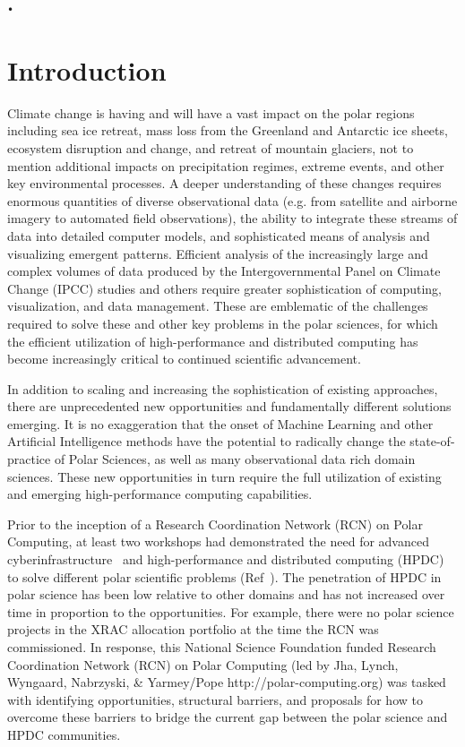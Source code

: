 \texttt{•}\documentclass[10pt,letterpaper,draft]{article}
\begin{document}
\vspace{0.15in}

\section{Introduction}

Climate change is having and will have a vast impact on the polar regions including sea ice retreat, mass loss from the Greenland and Antarctic ice sheets, ecosystem disruption and change, and retreat of mountain glaciers, not to mention additional impacts on precipitation regimes, extreme events, and other key environmental processes. A deeper understanding of these changes requires enormous quantities of diverse observational data (e.g. from satellite and airborne imagery to automated field observations), the ability to integrate these streams of data into detailed computer models, and sophisticated means of analysis and visualizing emergent patterns.  Efficient analysis of the increasingly large and complex volumes of data produced by the Intergovernmental Panel on Climate Change (IPCC) studies and others require greater sophistication of computing, visualization, and data management. These are emblematic of the challenges required to solve these and other key problems in the polar sciences, for which the efficient utilization of high-performance and distributed computing has become increasingly critical to continued scientific advancement.

In addition to scaling and increasing the sophistication of existing approaches, there are unprecedented new opportunities and fundamentally different solutions emerging. It is no exaggeration that the onset of Machine Learning and other Artificial Intelligence methods have the potential to radically change the state-of-practice of Polar Sciences, as well as many observational data rich domain sciences.  These new opportunities in turn require the full utilization of existing and emerging high-performance computing capabilities. 

Prior to the inception of a Research Coordination Network (RCN) on Polar Computing, at least two workshops had demonstrated the need for advanced cyberinfrastructure~\cite{Skytland2016-jk} and high-performance and distributed computing (HPDC) to solve different polar scientific problems (Ref~\cite{hackathon_guide,Leckart2015-go}). The penetration of HPDC in polar science has been low relative to other domains and has not increased over time in proportion to the opportunities. For example, there were no polar science projects in the XRAC allocation portfolio at the time the RCN was commissioned. In response, this National Science Foundation funded Research Coordination Network (RCN) on Polar Computing (led by Jha, Lynch, Wyngaard, Nabrzyski, \& Yarmey/Pope http://polar-computing.org) was tasked with identifying opportunities, structural barriers, and proposals for how to overcome these barriers to bridge the current gap between the polar science and HPDC communities.
\end{document}
